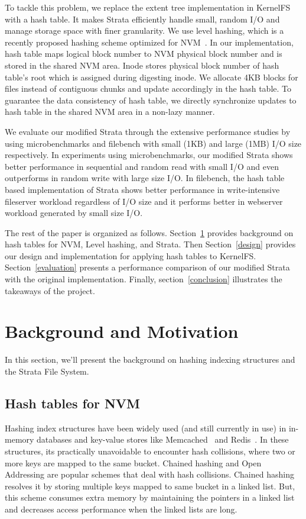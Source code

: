 \documentclass[letterpaper,twocolumn, 11pt]{article}
\begin{document}
To tackle this problem, we replace the extent tree implementation in KernelFS with a hash table. It makes Strata efficiently handle small, random I/O and manage storage space with finer granularity. We use level hashing, which is a recently proposed hashing scheme optimized for NVM~\cite{levelhashing}. In our implementation, hash table maps logical block number to NVM physical block number and is stored in the shared NVM area. Inode stores physical block number of hash table's root which is assigned during digesting inode. We allocate 4KB blocks for files instead of contiguous chunks and update accordingly in the hash table. To guarantee the data consistency of hash table, we directly synchronize updates to hash table in the shared NVM area in a non-lazy manner.

We evaluate our modified Strata through the extensive performance studies by using microbenchmarks and filebench with small (1KB) and large (1MB) I/O size respectively. In experiments using microbenchmarks, our modified Strata shows better performance in sequential and random read with small I/O and even outperforms in random write with large size I/O. In filebench, the hash table based implementation of Strata shows better performance in write-intensive fileserver workload regardless of I/O size and it performs better in webserver workload generated by small size I/O.

The rest of the paper is organized as follows. Section~\ref{Background} provides background on hash tables for NVM, Level hashing, and Strata. Then Section~\ref{design} provides our design and implementation for applying hash tables to KernelFS. Section~\ref{evaluation} presents a performance comparison of our modified Strata with the original implementation. Finally, section~\ref{conclusion} illustrates the takeaways of the project.

\section{Background and Motivation} \label{Background}
In this section, we'll present the background on hashing indexing structures and the Strata File System.
\vspace{-0.1cm}
\subsection{Hash tables for NVM}
Hashing index structures have been widely used (and still currently in use) in in-memory databases \cite{Garcia-molina92mainmemory} and key-value stores like Memcached~\cite{fitzpatrick2011memcached} and Redis~\cite{redis}. In these structures, its practically unavoidable to encounter hash collisions, where two or more keys are mapped to the same bucket. Chained hashing and Open Addressing are popular schemes that deal with hash collisions. Chained hashing resolves it by storing multiple keys mapped to same bucket in a linked list. But, this scheme consumes extra memory by maintaining the pointers in a linked list and decreases access performance when the linked lists are long. 
\end{document}
